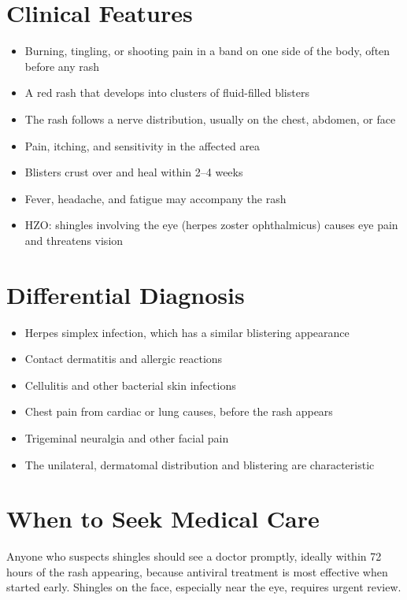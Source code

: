 \section*{Clinical Features}
\begin{itemize}
    \item Burning, tingling, or shooting pain in a band on one side of the body, often before any rash
    \item A red rash that develops into clusters of fluid-filled blisters
    \item The rash follows a nerve distribution, usually on the chest, abdomen, or face
    \item Pain, itching, and sensitivity in the affected area
    \item Blisters crust over and heal within 2--4 weeks
    \item Fever, headache, and fatigue may accompany the rash
    \item HZO: shingles involving the eye (herpes zoster ophthalmicus) causes eye pain and threatens vision
\end{itemize}

\section*{Differential Diagnosis}
\begin{itemize}
    \item Herpes simplex infection, which has a similar blistering appearance
    \item Contact dermatitis and allergic reactions
    \item Cellulitis and other bacterial skin infections
    \item Chest pain from cardiac or lung causes, before the rash appears
    \item Trigeminal neuralgia and other facial pain
    \item The unilateral, dermatomal distribution and blistering are characteristic
\end{itemize}

\section*{When to Seek Medical Care}
Anyone who suspects shingles should see a doctor promptly, ideally within 72 hours of the rash appearing, because antiviral treatment is most effective when started early. Shingles on the face, especially near the eye, requires urgent review.

